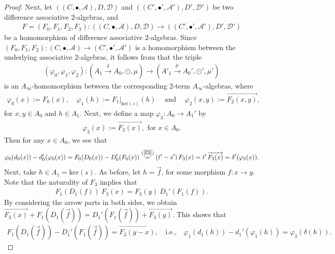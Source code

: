 \documentclass[a4paper,reqno,10pt]{amsart}
\theoremstyle{plain}
\theoremstyle{definition}
\theoremstyle{remark}
\begin{document}
\begin{proof}
Next, let $((C, \bullet, \mathcal{A}), D, \mathcal{D})$ and $( (C', \bullet', \mathcal{A}') , D', \mathcal{D}')$ be two difference associative $2$-algebras, and 
\begin{align*}
    F = (F_0, F_1, F_2, F_3) : ((C, \bullet, \mathcal{A}), D, \mathcal{D}) \rightarrow ( (C', \bullet', \mathcal{A}'), D', \mathcal{D}') 
\end{align*}
be a homomorphism of difference associative $2$-algebras. Since $(F_0, F_1, F_2) : (C, \bullet, \mathcal{A}) \rightarrow (C', \bullet' , \mathcal{A}')$ is a homomorphism between the underlying associative $2$-algebras, it follows from \cite{das-hom,kh} that the triple
\begin{align*}
     (\varphi_0, \varphi_1, \varphi_2) : (A_1 \xrightarrow{\delta} A_0, \odot, \mu ) \rightarrow (A'_1 \xrightarrow{\delta'} A_0', \odot', \mu' )
\end{align*}
is an $A_\infty$-homomorphism between the corresponding $2$-term $A_\infty$-algebras, where
\begin{align*}
    \varphi_0 (x) := F_0 (x), \quad \varphi_1 (h) := F_1 \big|_{\mathrm{ker} (s)} (h) ~~~~ \text{ and } ~~~~\varphi_2 (x, y) := \overrightarrow{F_2 (x, y)}, 
\end{align*}
for $x, y \in A_0$ and $h \in A_1$. Next, we define a map $\varphi_3 : A_0 \rightarrow A_1'$ by 
\begin{align*}
    \varphi_3 (x) := \overrightarrow{ F_3 (x) }, \text{ for } x \in A_0.
\end{align*}
Then for any $x \in A_0$, we see that
\begin{align*}
    \varphi_0 (d_0 (x)) - d_0'(\varphi_0 (x)) = F_0 (D_0 (x)) - D_0' (F_0 (x)) \stackrel{(\ref{f3})}{ = } (t' - s') ~\! F_3 (x) = t' ~\! \overrightarrow{ F_3 (x)} = \delta' (\varphi_3 (x)).
\end{align*}
Next, take $h \in A_1 = \mathrm{ker}(s)$. As before, let $h = \overrightarrow{f}$, for some morphism $f : x \rightarrow y$. Note that the naturality of $F_3$ implies that 
\begin{align*}
    F_1 (D_1 (f)) ~ \! F_3 (x) = F_3 (y) ~ \! D_1' (F_1 (f)).
\end{align*}
By considering the arrow parts in both sides, we obtain $\overrightarrow{ F_3 (x)} + F_1 ( D_1 (\overrightarrow{f})) = D_1'(F_1 (\overrightarrow{f}) ) + \overrightarrow{F_3 (y)}$. This shows that
\begin{align*}
    F_1 ( D_1 (\overrightarrow{f})) - D_1'(F_1 (\overrightarrow{f}) )  = \overrightarrow{F_3 (y-x)}, \quad \text{i.e.,} \quad \varphi_1 ( d_1 (h)) - d_1'(\varphi_1 (h)) = \varphi_3 (\delta ( h )).

\end{align*}
\end{proof}
\end{document}
